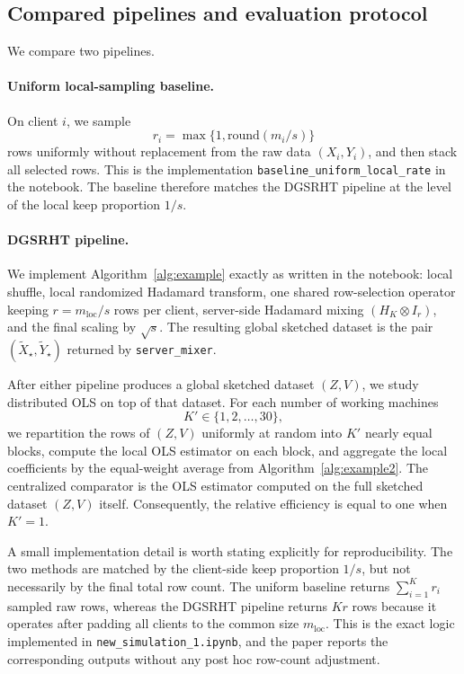\documentclass[11pt,a4paper]{article}
\begin{document}
\subsection{Compared pipelines and evaluation protocol}

We compare two pipelines.

\paragraph{Uniform local-sampling baseline.}
On client $i$, we sample
\[
r_{i}=\max\{1,\mathrm{round}(m_{i}/s)\}
\]
rows uniformly without replacement from the raw data $(X_{i},Y_{i})$, and then stack all selected rows. This is the implementation \texttt{baseline\_uniform\_local\_rate} in the notebook. The baseline therefore matches the DGSRHT pipeline at the level of the local keep proportion $1/s$.

\paragraph{DGSRHT pipeline.}
We implement Algorithm~\ref{alg:example} exactly as written in the notebook: local shuffle, local randomized Hadamard transform, one shared row-selection operator keeping $r=m_{\mathrm{loc}}/s$ rows per client, server-side Hadamard mixing $(H_{K}\otimes I_{r})$, and the final scaling by $\sqrt{s}$. The resulting global sketched dataset is the pair $(\tilde X_{\star},\tilde Y_{\star})$ returned by \texttt{server\_mixer}.

After either pipeline produces a global sketched dataset $(Z,V)$, we study distributed OLS on top of that dataset. For each number of working machines
\[
K' \in \{1,2,\ldots,30\},
\]
we repartition the rows of $(Z,V)$ uniformly at random into $K'$ nearly equal blocks, compute the local OLS estimator on each block, and aggregate the local coefficients by the equal-weight average from Algorithm~\ref{alg:example2}. The centralized comparator is the OLS estimator computed on the full sketched dataset $(Z,V)$ itself. Consequently, the relative efficiency is equal to one when $K'=1$.

A small implementation detail is worth stating explicitly for reproducibility. The two methods are matched by the client-side keep proportion $1/s$, but not necessarily by the final total row count. The uniform baseline returns $\sum_{i=1}^{K} r_{i}$ sampled raw rows, whereas the DGSRHT pipeline returns $Kr$ rows because it operates after padding all clients to the common size $m_{\mathrm{loc}}$. This is the exact logic implemented in \texttt{new\_simulation\_1.ipynb}, and the paper reports the corresponding outputs without any post hoc row-count adjustment.
\end{document}
